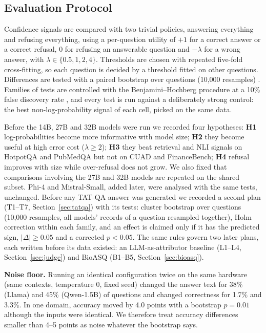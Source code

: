\documentclass[conference]{IEEEtran}
\begin{document}
\subsection{Evaluation Protocol}
\label{sec:protocol}
Confidence signals are compared with two trivial policies, answering everything and refusing everything, using a per-question utility of $+1$ for a
correct answer or a correct refusal, $0$ for refusing an answerable question and $-\lambda$ for a wrong answer, with $\lambda\in\{0.5,1,2,4\}$. Thresholds
are chosen with repeated five-fold cross-fitting, so each question is decided by a threshold fitted on other questions. Differences are tested with a
paired bootstrap over questions (10,000 resamples) \cite{efron1993bootstrap}. Families of tests are controlled with the Benjamini--Hochberg procedure
at a 10\% false discovery rate \cite{benjamini1995fdr}, and every test is run against a deliberately strong control: the best
non-log-probability signal of each cell, picked on the same data.

Before the 14B, 27B and 32B models were run we recorded four hypotheses: \textbf{H1} log-probabilities become more informative with model size;
\textbf{H2} they become useful at high error cost ($\lambda\geq2$); \textbf{H3} they beat retrieval and NLI signals on HotpotQA and PubMedQA but not on
CUAD and FinanceBench; \textbf{H4} refusal improves with size while over-refusal does not grow. We also fixed that comparisons involving the 27B and 32B
models are repeated on the shared subset. Phi-4 and Mistral-Small, added later, were analysed with the same tests, unchanged. Before any TAT-QA answer was generated we recorded a second plan (T1--T7, Section~\ref{sec:tatqa}) with its
tests: cluster bootstrap over questions (10,000 resamples, all models' records of a question resampled together), Holm correction within each family,
and an effect is claimed only if it has the predicted sign, $|\Delta|\geq0.05$ and a corrected $p<0.05$. The same rules govern two later plans,
each written before its data existed: an LLM-as-attributor baseline (L1--L4, Section~\ref{sec:judge}) and BioASQ (B1--B5, Section~\ref{sec:bioasq}).

\textbf{Noise floor.} Running an identical configuration twice on the same hardware (same contexts, temperature 0, fixed seed) changed the answer text
for 38\% (Llama) and 45\% (Qwen-1.5B) of questions and changed correctness for 1.7\% and 3.3\%. In one domain, accuracy moved by 4.0 points with a
bootstrap $p=0.01$ although the inputs were identical. We therefore treat accuracy differences smaller than 4--5 points as noise whatever the bootstrap
says.
\end{document}

